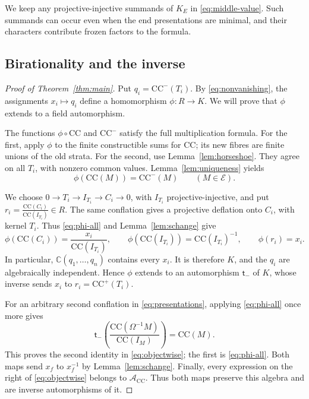 \documentclass[11pt]{amsart}
\numberwithin{equation}{section}
\theoremstyle{definition}
\theoremstyle{remark}
\newcommand{\E}{\mathcal E}
\newcommand{\CC}{\mathrm{CC}}
\newcommand{\kk}{\mathbb C}
\begin{document}
We keep any projective-injective summands of $K_E$ in
\eqref{eq:middle-value}. Such summands can occur even when the end
presentations are minimal, and their characters contribute frozen
factors to the formula.

\subsection{Birationality and the inverse}\label{sec:birational}

\begin{proof}[Proof of Theorem~\ref{thm:main}]
Put $q_i=\CC^-(T_i)$. By
\eqref{eq:nonvanishing}, the assignments $x_i\mapsto q_i$ define a
homomorphism $\phi:R\to K$.
We will prove that $\phi$ extends to a field automorphism.

The functions $\phi\circ\CC$ and $\CC^-$ satisfy the full
multiplication formula. For the first, apply $\phi$ to the finite
constructible sums for $\CC$; its new fibres are finite unions of the
old strata. For the second, use Lemma~\ref{lem:horseshoe}. They agree on
all $T_i$, with nonzero common values. Lemma~\ref{lem:uniqueness} yields
\begin{equation}\label{eq:phi-all} \phi(\CC(M))=\CC^-(M)\qquad(M\in\E).\end{equation}

We choose $0\to T_i\to I_{T_i}\to C_i\to0$, with $I_{T_i}$ projective-injective,
and put $r_i=\frac{\CC(C_i)}{\CC(I_{T_i})}\in R$.
The same conflation gives a projective deflation onto $C_i$, with kernel
$T_i$. Thus \eqref{eq:phi-all} and Lemma~\ref{lem:schange} give
\[ \phi(\CC(C_i))=\frac{x_i}{\CC(I_{T_i})},\qquad \phi(\CC(I_{T_i}))=\CC(I_{T_i})^{-1},\qquad \phi(r_i)=x_i. \]
In particular, $\kk(q_1,\ldots,q_n)$ contains every $x_i$. It is
therefore $K$, and the $q_i$ are algebraically independent. Hence
$\phi$ extends to an automorphism $\mathsf t_-$ of $K$, whose
inverse sends $x_i$ to $r_i=\CC^+(T_i)$.

For an arbitrary second conflation in \eqref{eq:presentations}, applying
\eqref{eq:phi-all} once more gives
\[ \mathsf t_-\left(\frac{\CC(\Omega^{-1}M)}{\CC(I_M)}\right)=\CC(M). \]
This proves the second identity in \eqref{eq:objectwise}; the first is
\eqref{eq:phi-all}. Both maps send $x_f$ to $x_f^{-1}$ by
Lemma~\ref{lem:schange}. Finally, every expression on the right of
\eqref{eq:objectwise} belongs to $\mathscr A_\CC$. Thus both maps
preserve this algebra and are inverse automorphisms of it.
\end{proof}
\end{document}
